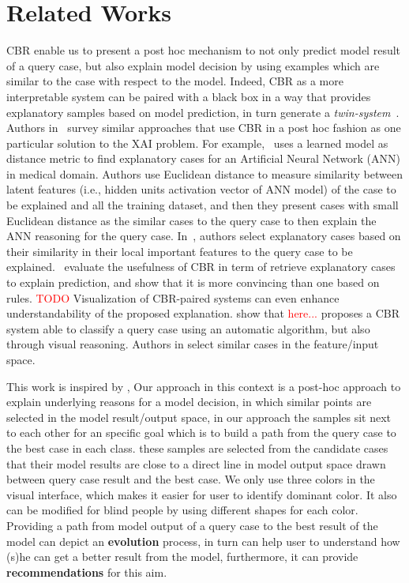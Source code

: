 \documentclass{llncs}
\begin{document}
\section{Related Works}
CBR enable us to present a post hoc mechanism to not only predict model result of a query case, but also explain model decision by using examples which are similar to the case with respect to the model. Indeed, CBR as a more interpretable system can be paired with a black box in a way that provides explanatory samples based on model prediction, in turn generate a \textit{twin-system}~\cite{keane2019case}. Authors in~\cite{keane2019case} survey similar approaches that use CBR in a post hoc fashion as one particular solution to the XAI problem. For example,~\cite{caruana1999case} uses a learned model as distance metric to find explanatory cases for an Artificial Neural Network (ANN) in medical domain. Authors use Euclidean distance to measure similarity between latent features (i.e., hidden units activation vector of ANN model) of the case to be explained and all the training dataset, and then they present cases with small Euclidean distance as the similar cases to the query case to then explain the ANN reasoning for the query case. In~\cite{nugent2005case}, authors select explanatory cases based on their similarity in their local important features to the query case to be explained.~\cite{cunningham2003evaluation} evaluate the usefulness of CBR in term of retrieve explanatory cases to explain prediction, and show that it is more convincing than one based on rules. 
\textcolor{red}{TODO}
Visualization of CBR-paired systems can even enhance understandability of the proposed explanation. \cite{massie2004visualisation} show that \textcolor{red}{here...}
\cite{lamy2019explainable} proposes a CBR system able to classify a query case using an automatic algorithm, but also through visual reasoning. Authors in \cite{lamy2019explainable} select similar cases in the feature/input space.

This work is inspired by \cite{lamy2019explainable},
Our approach in this context is a post-hoc approach to explain underlying reasons for a model decision, in which similar points are selected in the model result/output space, in our approach the samples sit next to each other for an specific goal which is to build a path from the query case to the best case in each class. these samples are selected from the candidate cases that their model results are close to a direct line in model output space drawn between query case result and the best case. We only use three colors in the visual interface, which makes it easier for user to identify dominant color. It also can be modified for blind people by using different shapes for each color. Providing a path from model output of a query case to the best result of the model can depict an \textbf{evolution} process, in turn can help user to understand how (s)he can get a better result from the model, furthermore, it can provide \textbf{recommendations} for this aim.
\end{document}
